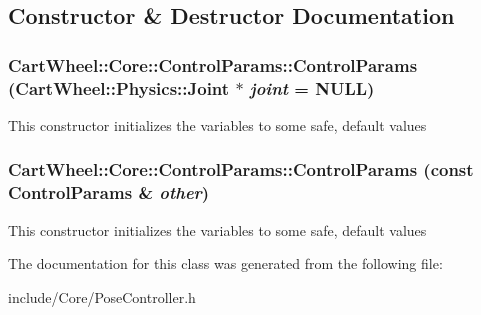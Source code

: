 \subsection{Constructor \& Destructor Documentation}
\hypertarget{classCartWheel_1_1Core_1_1ControlParams_a9051298662f8ef3f44bf778115eb7087}{
\subsubsection[{ControlParams}]{\setlength{\rightskip}{0pt plus 5cm}CartWheel::Core::ControlParams::ControlParams ({\bf CartWheel::Physics::Joint} $\ast$ {\em joint} = {\ttfamily NULL})}}
\label{classCartWheel_1_1Core_1_1ControlParams_a9051298662f8ef3f44bf778115eb7087}
This constructor initializes the variables to some safe, default values \hypertarget{classCartWheel_1_1Core_1_1ControlParams_af4ed7e016869736471eef845a654a7ff}{
\subsubsection[{ControlParams}]{\setlength{\rightskip}{0pt plus 5cm}CartWheel::Core::ControlParams::ControlParams (const {\bf ControlParams} \& {\em other})}}
\label{classCartWheel_1_1Core_1_1ControlParams_af4ed7e016869736471eef845a654a7ff}
This constructor initializes the variables to some safe, default values 

The documentation for this class was generated from the following file:\begin{DoxyCompactItemize}
\item 
include/Core/PoseController.h\end{DoxyCompactItemize}
